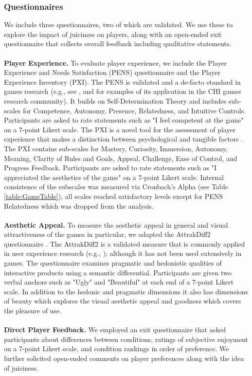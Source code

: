 \documentclass{sigchi}
\begin{document}
\subsubsection{Questionnaires}
We include three questionnaires, two of which are validated. We use these to explore the impact of juiciness on players, along with an open-ended exit questionnaire that collects overall feedback including qualitative statements.
\\\\
\textbf{Player Experience.} To evaluate player experience, we include the Player Experience and Needs Satisfaction (PENS) questionnaire and the Player Experience Inventory (PXI). The PENS is validated and a de-facto standard in games research (e.g., see \cite{ang2017comparing}, \cite{hicks2015exploring} and \cite{bowey2015manipulating} for examples of its application in the CHI games research community). It builds on Self-Determination Theory \cite{ryan2000self,ryan2006motivational} and includes sub-scales for Competence, Autonomy, Presence, Relatedness, and Intuitive Controls. Participants are asked to rate statements such as "I feel competent at the game" on a 7-point Likert scale. The PXI is a novel tool for the assessment of player experience that makes a distinction between psychological and tangible factors \cite{vanden2016design}. The PXI contains sub-scales for Mastery, Curiosity, Immersion, Autonomy, Meaning, Clarity of Rules and Goals, Appeal, Challenge, Ease of Control, and Progress Feedback. Participants are asked to rate statements such as "I appreciated the aesthetics of the game" on a 7-point Likert scale. Internal consistence of the subscales was measured via Cronbach's Alpha (see Table \ref{table:GameTable}), all scales reached satisfactory levels except for PENS Relatedness which was dropped from the analysis.
\\\\
\textbf{Aesthetic Appeal.} To measure the aesthetic appeal in general and visual attractiveness of the games in particular, we adapted the AttrakDiff2 questionnaire \cite{hassenzahl2003attrakdiff}. The AttrakDiff2 is a validated measure that is commonly applied in user experience research (e.g., \cite{hassenzahl2006hedonic}); although it has not been used extensively in games. The questionnaire examines pragmatic and hedonistic qualities of interactive products using a semantic differential. Participants are given two verbal anchors such as "Ugly" and "Beautiful" at each end of a 7-point Likert scale. In addition to the hedonic and pragmatic dimensions it also has dimensions of beauty which explores the visual aesthetic appeal and goodness which covers the pleasure of use.
\\\\
\textbf{Direct Player Feedback.} We employed an exit questionnaire that asked participants about differences between conditions, ratings of subjective enjoyment on a 7-point Likert scale, and condition rankings in order of preference. We further solicited open-ended comments on player preferences along with the idea of juiciness.
\end{document}
